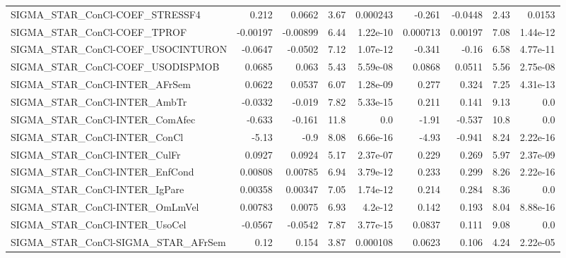\begin{tabular}{lrrrrrrrr}
SIGMA\_STAR\_ConCl-COEF\_STRESSF4        &       0.212 &       0.0662 &     3.67 & 0.000243 &     -0.261 &     -0.0448 &         2.43 &        0.0153 \\
SIGMA\_STAR\_ConCl-COEF\_TPROF           &    -0.00197 &     -0.00899 &     6.44 & 1.22e-10 &   0.000713 &     0.00197 &         7.08 &      1.44e-12 \\
SIGMA\_STAR\_ConCl-COEF\_USOCINTURON     &     -0.0647 &      -0.0502 &     7.12 & 1.07e-12 &     -0.341 &       -0.16 &         6.58 &      4.77e-11 \\
SIGMA\_STAR\_ConCl-COEF\_USODISPMOB      &      0.0685 &        0.063 &     5.43 & 5.59e-08 &     0.0868 &      0.0511 &         5.56 &      2.75e-08 \\
SIGMA\_STAR\_ConCl-INTER\_AFrSem         &      0.0622 &       0.0537 &     6.07 & 1.28e-09 &      0.277 &       0.324 &         7.25 &      4.31e-13 \\
SIGMA\_STAR\_ConCl-INTER\_AmbTr          &     -0.0332 &       -0.019 &     7.82 & 5.33e-15 &      0.211 &       0.141 &         9.13 &           0.0 \\
SIGMA\_STAR\_ConCl-INTER\_ComAfec        &      -0.633 &       -0.161 &     11.8 &      0.0 &      -1.91 &      -0.537 &         10.8 &           0.0 \\
SIGMA\_STAR\_ConCl-INTER\_ConCl          &       -5.13 &         -0.9 &     8.08 & 6.66e-16 &      -4.93 &      -0.941 &         8.24 &      2.22e-16 \\
SIGMA\_STAR\_ConCl-INTER\_CulFr          &      0.0927 &       0.0924 &     5.17 & 2.37e-07 &      0.229 &       0.269 &         5.97 &      2.37e-09 \\
SIGMA\_STAR\_ConCl-INTER\_EnfCond        &     0.00808 &      0.00785 &     6.94 & 3.79e-12 &      0.233 &       0.299 &         8.26 &      2.22e-16 \\
SIGMA\_STAR\_ConCl-INTER\_IgPare         &     0.00358 &      0.00347 &     7.05 & 1.74e-12 &      0.214 &       0.284 &         8.36 &           0.0 \\
SIGMA\_STAR\_ConCl-INTER\_OmLmVel        &     0.00783 &       0.0075 &     6.93 &  4.2e-12 &      0.142 &       0.193 &         8.04 &      8.88e-16 \\
SIGMA\_STAR\_ConCl-INTER\_UsoCel         &     -0.0567 &      -0.0542 &     7.87 & 3.77e-15 &     0.0837 &       0.111 &         9.08 &           0.0 \\
SIGMA\_STAR\_ConCl-SIGMA\_STAR\_AFrSem    &        0.12 &        0.154 &     3.87 & 0.000108 &     0.0623 &       0.106 &         4.24 &      2.22e-05 \\

\end{tabular}
